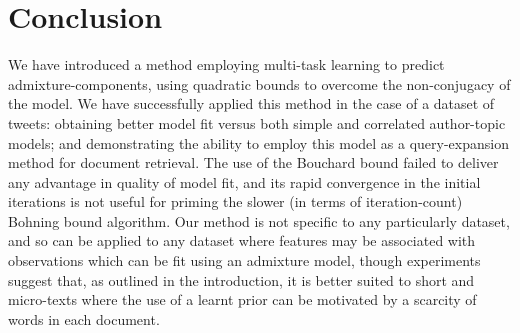 \section{Conclusion}
We have introduced a method employing multi-task learning to predict admixture-components, using quadratic bounds to overcome the non-conjugacy of the model. We have successfully applied this method in the case of a dataset of tweets: obtaining better model fit versus both simple and correlated author-topic models; and demonstrating the ability to employ this model as a query-expansion method for document retrieval. The use of the Bouchard bound failed to deliver any advantage in quality of model fit, and its rapid convergence in the initial iterations is not useful for priming the slower (in terms of iteration-count) Bohning bound algorithm.  Our method is not specific to any particularly dataset, and so can be applied to any dataset where features may be associated with observations which can be fit using an admixture model, though experiments suggest that, as outlined in the introduction, it is better suited to short and micro-texts where the use of a learnt prior can be motivated by a scarcity of words in each document.


%



